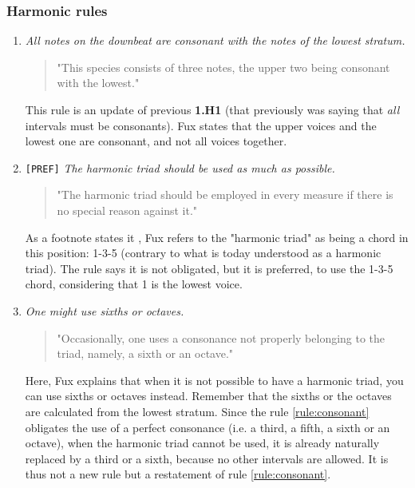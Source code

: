 \subsubsection{Harmonic rules}
\begin{enumerate}[wide, label=\bfseries 1.H\arabic*]
    \item\label{rule:consonant} \greendots \textit{All notes on the downbeat are consonant with the notes of the lowest stratum.}
     
    \begin{quotation}
       "This species consists of three notes, the upper two being consonant with the lowest."
       \textcite[p.71]{GaPEng}
   \end{quotation}

   This rule is an update of previous \textbf{1.H1} (that previously was saying that \textit{all} intervals must be consonants). Fux states that the upper voices and the lowest one are consonant, and not all voices together. 
    
    \setcounter{enumi}{7} %

    \item\label{rule:harmonic-triad} \texttt{[PREF]}  \textit{The harmonic triad should be used as much as possible.} 

    \begin{quotation}
    "The harmonic triad should be employed in every measure if there is no special reason against it."
    \textcite[p.71]{GaPEng}
    \end{quotation}

    As a footnote states it \cite[footnote, p.71]{GaPEng}, Fux refers to the "harmonic triad" as being a chord in this position: 1-3-5 (contrary to what is today understood as a harmonic triad).
    The rule says it is not obligated, but it is preferred, to use the 1-3-5 chord, considering that 1 is the lowest voice.
    

    \item\label{rule:sixth-or-octaves}  \textit{One might use sixths or octaves.}

    \begin{quotation}
    "Occasionally, one uses a consonance not properly belonging to the triad, namely, a sixth or an octave."
    \textcite[p.72]{GaPEng}
    \end{quotation}

    Here, Fux explains that when it is not possible to have a harmonic triad, you can use sixths or octaves instead. Remember that the sixths or the octaves are calculated from the lowest stratum. Since the rule \ref{rule:consonant} obligates the use of a perfect consonance (i.e. a third, a fifth, a sixth or an octave), when the harmonic triad cannot be used, it is already naturally replaced by a third or a sixth, because no other intervals are allowed. It is thus not a new rule but a restatement of rule \ref{rule:consonant}.    


\end{enumerate}
